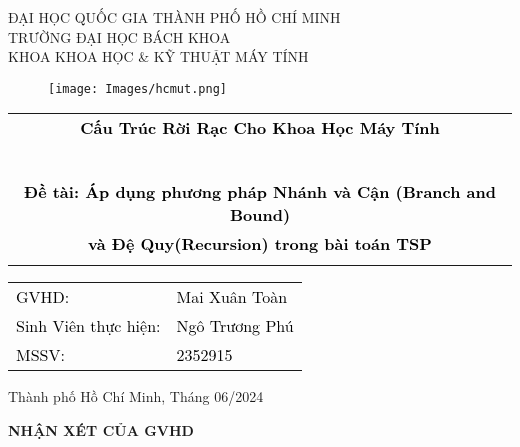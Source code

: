 \documentclass[a4paper]{article}
\begin{document}
\begin{titlepage}
\begin{center}
ĐẠI HỌC QUỐC GIA THÀNH PHỐ HỒ CHÍ MINH \\
TRƯỜNG ĐẠI HỌC BÁCH KHOA \\
KHOA KHOA HỌC \& KỸ THUẬT MÁY TÍNH 
\end{center}
\vspace{1cm}
\begin{figure}[h!]
\begin{center}
\texttt{[image: Images/hcmut.png]}
\end{center}
\end{figure}
\vspace{1cm}


\begin{center}
\begin{tabular}{c}
\multicolumn{1}{c}{\textbf{{\Large \textcolor{black}{Cấu Trúc Rời Rạc Cho Khoa Học Máy Tính}}}}\\
~~\\
\arrayrulecolor{black}\hline
\\

\textbf{\large \textcolor{black}{Đề tài: Áp dụng phương pháp Nhánh và Cận (Branch and Bound)}} \\
\textbf{\large \textcolor{black}{ và Đệ Quy(Recursion) trong bài toán TSP }}
\\
\arrayrulecolor{black}\hline
\end{tabular}
\end{center}

\vspace{1.5cm}

\begin{table}[h]
\centering
\begin{tabular}{p{5cm} l} %
\textcolor{black}{GVHD:} & \textcolor{black}{Mai Xuân Toàn} \\
\textcolor{black}{Sinh Viên thực hiện:} & \textcolor{black}{Ngô Trương Phú} \\
\textcolor{black}{MSSV:} & \textcolor{black}{2352915} \\
\end{tabular}
\end{table}

\lstset{style=mystyle}
\vspace{1.5cm}
\begin{center}
{\footnotesize Thành phố Hồ Chí Minh, Tháng 06/2024}
\end{center}
\end{titlepage}
\newpage
\begin{center}
    {\LARGE\bf NHẬN XÉT CỦA GVHD}
\end{center}
\newpage
\tableofcontents
\newpage
\end{document}

